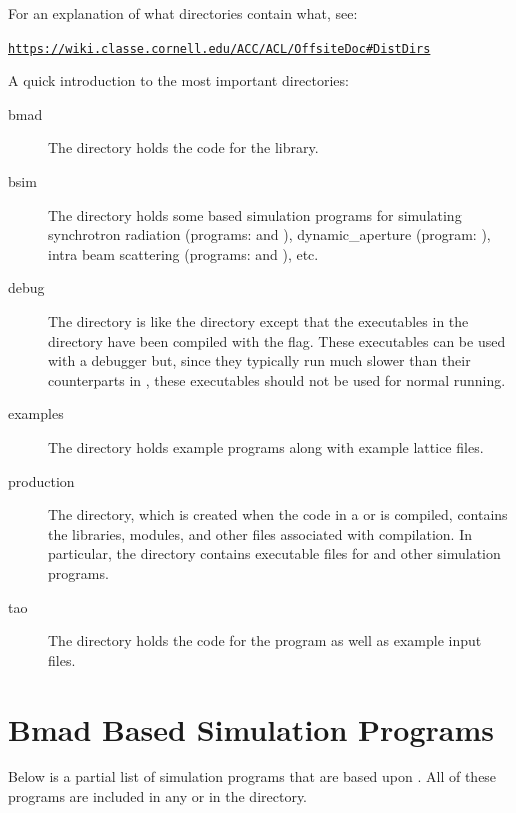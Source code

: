 \documentclass{hitec}
\newenvironment{display}
  {\vspace*{-1.5ex} \begin{alltt}}
  {\end{alltt} \vspace*{-1.0ex}}
\begin{document}
For an explanation of what directories contain what, see:
\begin{display}
  \url{https://wiki.classe.cornell.edu/ACC/ACL/OffsiteDoc#DistDirs}
\end{display}

A quick introduction to the most important directories:
  \begin{description}
  \item[bmad] \Newline
The  directory holds the code for the \bmad library.
  \item[bsim] \Newline
The  directory holds some \bmad based simulation programs for simulating
synchrotron radiation (programs:  and ), dynamic_aperture
(program: ), intra beam scattering (programs:  and
), etc.
  \item[debug] \Newline
The  directory is like the  directory except that the executables
in the  directory have been compiled with the  flag. These executables
can be used with a debugger but, since they typically run much slower than their counterparts in
, these executables should not be used for normal running.
  \item[examples] \Newline
The  directory holds example programs along with example lattice files.
  \item[production] \Newline
The  directory, which is created when the code in a  or
 is compiled, contains the libraries, modules, and other files associated with
compilation. In particular, the  directory contains executable files
for \tao and other simulation programs.

  \item[tao] \Newline
The  directory holds the code for the \tao program as well as example input
files.
  \end{description}

\section{Bmad Based Simulation Programs}
\label{s:programs}

Below is a partial list of simulation programs that are based upon \bmad. All of these
programs are included in any  or  in the 
directory.
\end{document}
